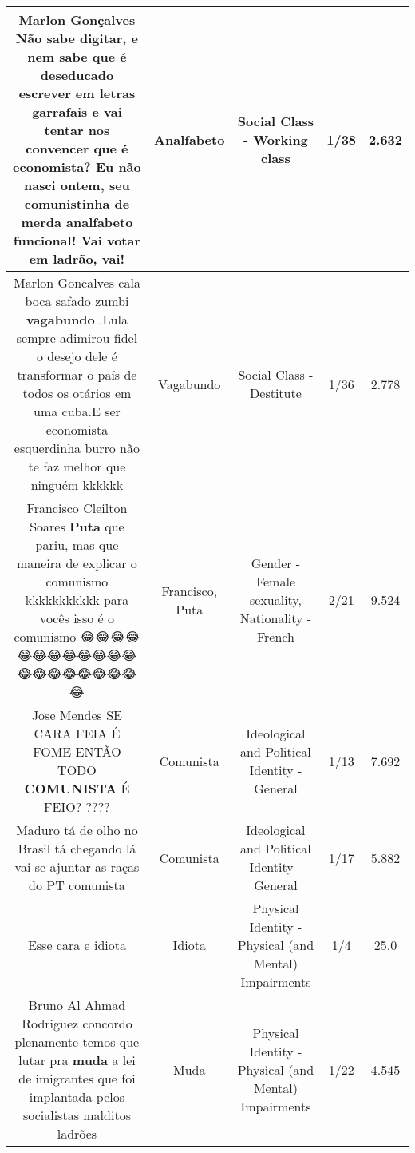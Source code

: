 \documentclass[11pt]{article}
\newlength\mylength
\begin{document}
\begin{center}
\begin{longtable}{|C{.65\mylength}|C{.30\mylength}|C{.12\mylength}|C{.12\mylength}|C{.12\mylength}|}
  \small Marlon Gonçalves Não sabe digitar, e nem sabe que é deseducado escrever em letras garrafais e vai tentar nos convencer que é economista? Eu não nasci ontem, seu comunistinha de merda \textbf{analfabeto} funcional! Vai votar em ladrão, vai!\normalsize   & Analfabeto & Social Class - Working class & 1/38 & 2.632 \\  \hline
  \small Marlon Goncalves  cala boca safado zumbi \textbf{vagabundo} .Lula sempre adimirou fidel o desejo dele é transformar o país de todos os otários em uma cuba.E ser economista esquerdinha burro não te faz melhor que ninguém kkkkkk\normalsize   & Vagabundo & Social Class - Destitute & 1/36 & 2.778 \\  \hline
  \small Francisco Cleilton Soares \textbf{Puta} que pariu, mas que maneira de explicar o comunismo kkkkkkkkkkk para vocês isso é o comunismo 😂😂😂😂😂😂😂😂😂😂😂😂😂😂😂😂😂😂😂😂😂\normalsize   & Francisco, Puta & Gender - Female sexuality, Nationality - French & 2/21 & 9.524 \\  \hline
  \small Jose Mendes SE CARA FEIA É FOME ENTÃO TODO \textbf{COMUNISTA} É FEIO? ????\normalsize   & Comunista & Ideological and Political Identity - General & 1/13 & 7.692 \\  \hline
  \small Maduro tá de olho no Brasil tá chegando lá vai se ajuntar as raças do PT comunista\normalsize   & Comunista & Ideological and Political Identity - General & 1/17 & 5.882 \\  \hline
  \small Esse cara e idiota\normalsize   & Idiota & Physical Identity - Physical (and Mental) Impairments & 1/4 & 25.0 \\  \hline
  \small Bruno Al Ahmad Rodriguez concordo plenamente temos que lutar pra \textbf{muda} a lei de imigrantes que foi implantada pelos socialistas malditos ladrões\normalsize   & Muda & Physical Identity - Physical (and Mental) Impairments & 1/22 & 4.545 \\  \hline

\end{longtable}
\end{center}
\end{document}
